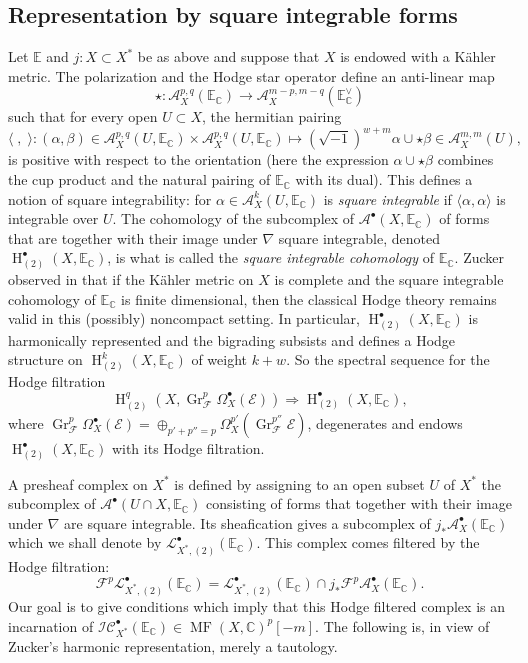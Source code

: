 \documentclass[12pt,letterpaper]{amsart}
\numberwithin{equation}{section}
\def\CC{{\mathbb C}}
\def\EE{{\mathbb E}}
\def\Ascr{{\mathscr A}}
\def\Ecal{{\mathcal E}}
\def\Fcal{{\mathcal F}}
\def\Iscr{{\mathscr I}}
\def\Lscr{{\mathscr L}}
\def\Cscr{{\mathscr C}}
\def\la{\langle}
\def\ra{\rangle}
\def\pt{{\scriptscriptstyle\bullet}}
\newcommand\Gr{\operatorname{Gr}}
\newcommand\Hl{\operatorname{H}}
\newcommand\MF{\operatorname{MF}}
\theoremstyle{remark}
\begin{document}
\subsection*{Representation by square integrable forms}
Let $\EE$ and $j:X\subset X^*$ be as above and suppose that $X$ is endowed with a K\"ahler metric. 
The polarization and the Hodge star  operator define an anti-linear map 
\[
\star: \Ascr^{p,q}_X(\EE_\CC)\to \Ascr^{m-p,m-q}_X(\EE_\CC^\vee)
\]
such that for every open $U\subset X$, the hermitian pairing 
\[
\la\;,\; \ra: (\alpha, \beta)\in \Ascr^{p,q}_X(U,\EE_\CC)\times \Ascr^{p,q}_X(U,\EE_\CC)\mapsto  
(\sqrt{-1})^{w+m} \alpha\cup\star\beta\in \Ascr^{m,m}_X(U),
\]
is positive with respect to the orientation (here the expression 
$\alpha\cup\star\beta$ combines  the cup product and the natural pairing of $\EE_\CC$ with its dual).
This defines a notion of square integrability: for
$\alpha\in \Ascr^k_X(U,\EE_\CC)$ is  \emph{square integrable} if $\la \alpha, \alpha\ra$ is integrable over $U$.  
The  cohomology of the  subcomplex of  $\Ascr^\pt(X,\EE_\CC)$  of forms that are together with their image under 
$\nabla$ square integrable, denoted 
$\Hl^\pt_{(2)}(X, \EE_\CC)$, is what is called the \emph{square integrable cohomology} of $\EE_\CC$. 
Zucker observed  in \cite{zucker:warped} that  if the K\"ahler metric on $X$ is complete and the square integrable 
cohomology of $\EE_\CC$ is finite dimensional, then the classical Hodge theory remains valid in this (possibly) noncompact setting. 
In particular, $\Hl^\pt_{(2)}(X, \EE_\CC)$ is 
harmonically represented and the  bigrading subsists and defines a Hodge structure on $\Hl^k_{(2)}(X, \EE_\CC)$ of weight $k+w$. So the spectral sequence for the Hodge filtration
\[
\Hl^q_{(2)}(X,\Gr_\Fcal^p \Omega_X^\pt(\Ecal))\Rightarrow  \Hl_{(2)}^\pt(X, \EE_\CC),
\]
where $\Gr_\Fcal^p \Omega_X^\pt(\Ecal)=\oplus_{p'+p''=p} \Omega_X^{p'}(\Gr_\Fcal^{p''}\Ecal)$,
degenerates  and endows $\Hl_{(2)}^\pt(X, \EE_\CC)$ with its Hodge filtration.

A presheaf complex on $X^*$ is defined by  assigning to an open subset $U$ of ${X^*}$ the subcomplex
of $\Ascr^\pt(U\cap X,\EE_\CC)$ consisting of forms that together with their image under $\nabla$ are square integrable.
Its sheafication gives   a subcomplex of $ j_* \Ascr_X^\pt(\EE_\CC)$ 
which we shall denote by $\Lscr^\pt_{{X^*},(2)}(\EE_\CC)$.
This complex comes filtered by the Hodge filtration:
\[
\textstyle \Fcal^p\Lscr^\pt_{{X^*},(2)}(\EE_\CC)=\Lscr^\pt_{{X^*},(2)}(\EE_\CC)\cap j_* \Fcal^p\Ascr^{\pt}_X(\EE_\CC).
\]
Our goal is to give conditions which imply  that this Hodge filtered complex is an incarnation of  
$\Iscr\Cscr_{X^*}^\pt(\EE_\CC)\in \MF(X, \CC)^p[-m]$.  The following is, in view of Zucker's  
harmonic representation,  merely a tautology. 
\end{document}
